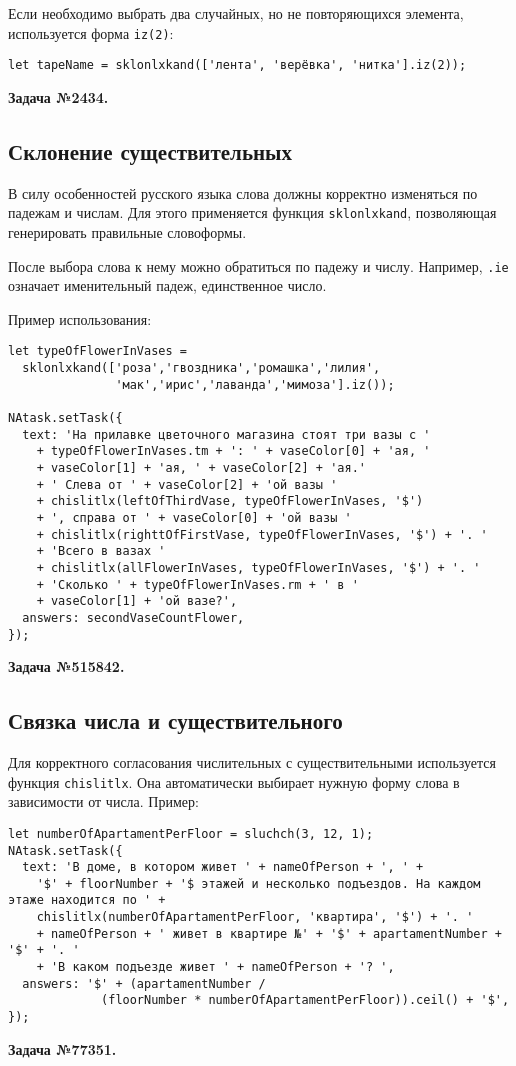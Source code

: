 Если необходимо выбрать два случайных, но не повторяющихся элемента, используется форма \texttt{iz(2)}:  
\begin{lstlisting}
let tapeName = sklonlxkand(['лента', 'верёвка', 'нитка'].iz(2));
\end{lstlisting}
\textbf{Задача №2434.}

\subsection{Склонение существительных}

В силу особенностей русского языка слова должны корректно изменяться по падежам и числам. Для этого применяется функция \texttt{sklonlxkand}, позволяющая генерировать правильные словоформы.  

После выбора слова к нему можно обратиться по падежу и числу. Например, \texttt{.ie} означает именительный падеж, единственное число.  

Пример использования:
\begin{lstlisting}
let typeOfFlowerInVases =
  sklonlxkand(['роза','гвоздника','ромашка','лилия',
               'мак','ирис','лаванда','мимоза'].iz());

NAtask.setTask({
  text: 'На прилавке цветочного магазина стоят три вазы с '
    + typeOfFlowerInVases.tm + ': ' + vaseColor[0] + 'ая, '
    + vaseColor[1] + 'ая, ' + vaseColor[2] + 'ая.' 
    + ' Слева от ' + vaseColor[2] + 'ой вазы '
    + chislitlx(leftOfThirdVase, typeOfFlowerInVases, '$')
    + ', справа от ' + vaseColor[0] + 'ой вазы '
    + chislitlx(righttOfFirstVase, typeOfFlowerInVases, '$') + '. '
    + 'Всего в вазах '
    + chislitlx(allFlowerInVases, typeOfFlowerInVases, '$') + '. '
    + 'Сколько ' + typeOfFlowerInVases.rm + ' в '
    + vaseColor[1] + 'ой вазе?',
  answers: secondVaseCountFlower,
});
\end{lstlisting}
\textbf{Задача №515842.}

\subsection{Связка числа и существительного}

Для корректного согласования числительных с существительными используется функция \texttt{chislitlx}. Она автоматически выбирает нужную форму слова в зависимости от числа.  
Пример:
\begin{lstlisting}
let numberOfApartamentPerFloor = sluchch(3, 12, 1);
NAtask.setTask({
  text: 'В доме, в котором живет ' + nameOfPerson + ', ' +
    '$' + floorNumber + '$ этажей и несколько подъездов. На каждом этаже находится по ' +
    chislitlx(numberOfApartamentPerFloor, 'квартира', '$') + '. '
    + nameOfPerson + ' живет в квартире №' + '$' + apartamentNumber + '$' + '. '
    + 'В каком подъезде живет ' + nameOfPerson + '? ',
  answers: '$' + (apartamentNumber /
             (floorNumber * numberOfApartamentPerFloor)).ceil() + '$',
});
\end{lstlisting}
\textbf{Задача №77351.}

